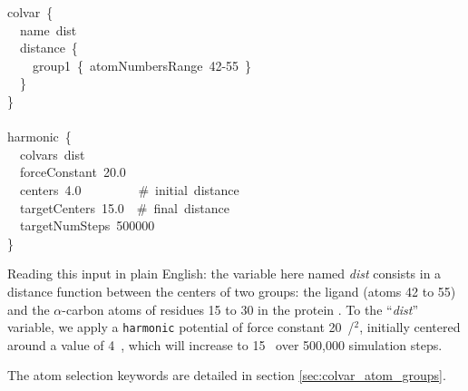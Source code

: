 \begin{cvexampleinput}
colvar~\{\\
\-~~name~dist\\
\-~~distance~\{\\
\-~~~~group1~\{~atomNumbersRange~42-55~\}\\
\-
\-
\-~~\}\\
\-\}\\
\-\\
\-harmonic~\{\\
\-~~colvars~dist\\
\-~~forceConstant~20.0\\
\-~~centers~4.0~~~~~~~~~\#~initial~distance\\
\-~~targetCenters~15.0~~\#~final~distance\\
\-~~targetNumSteps~500000\\
\}
\end{cvexampleinput}

Reading this input in plain English: the variable here named \emph{dist} consists in a distance function between the centers of two groups: the ligand (atoms 42 to 55) and the $\alpha$-carbon atoms of residues 15 to 30 in the protein .
To the ``\emph{dist}'' variable, we apply a \texttt{harmonic} potential of force constant 20~\energyunit/\lengthunit$^2$, initially centered around a value of 4~\lengthunit, which will increase to 15~\lengthunit{} over 500,000 simulation steps.

The atom selection keywords are detailed in section \ref{sec:colvar_atom_groups}.


